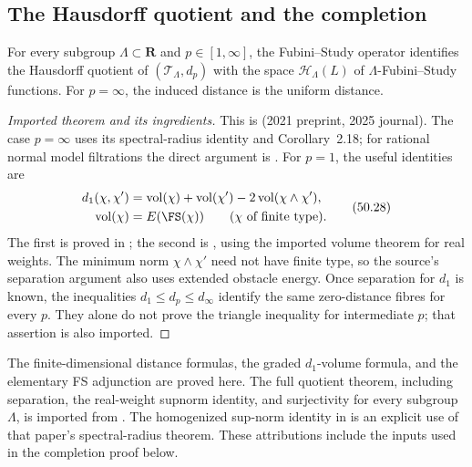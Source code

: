 \subsection{The Hausdorff quotient and the completion}
\label{sec:ch50-quotient}

\begin{theorem}\label{thm:stability-fs-quotient}
For every subgroup $\Lambda\subset\mathbf R$ and
$p\in[1,\infty]$, the Fubini--Study operator identifies the Hausdorff
quotient of $(\mathcal T_\Lambda,d_p)$ with the space
$\mathcal H_\Lambda(L)$ of $\Lambda$-Fubini--Study functions.
For $p=\infty$, the induced distance is the uniform distance.
\end{theorem}

\begin{proof}[Imported theorem and its ingredients]
This is \cite[Theorem~A]{BJKS1} (2021 preprint, 2025 journal).
The case $p=\infty$ uses its spectral-radius identity and
Corollary~2.18; for rational normal model filtrations the direct argument
is .  For $p=1$, the useful identities are
\[
\begin{split}
 d_1(\chi,\chi')
 &=\operatorname{vol}(\chi)+\operatorname{vol}(\chi')
       -2\operatorname{vol}(\chi\wedge\chi'),\\
 \operatorname{vol}(\chi)&=E(\FS(\chi))
       \qquad(\chi\text{ of finite type}).
\end{split}
\tag{50.28}\label{eq:stability-d1-volume-energy}
\]
The first is proved in ; the second is
, using the imported volume theorem for real
weights.  The minimum norm $\chi\wedge\chi'$ need not have finite
type, so the source's separation argument also uses extended obstacle
energy.  Once separation for $d_1$ is known, the inequalities
$d_1\le d_p\le d_\infty$ identify the same zero-distance fibres for
every $p$.  They alone do not prove the triangle inequality for
intermediate $p$; that assertion is also imported.
\end{proof}

\begin{remark}
\label{rem:ch50-quotient-status}
The finite-dimensional distance formulas, the graded $d_1$-volume
formula, and the elementary FS adjunction are proved here.  The full
quotient theorem, including separation, the real-weight supnorm identity,
and surjectivity for every subgroup $\Lambda$, is imported from
\cite[Theorem~A]{BJKS1}.  The homogenized sup-norm identity in
 is an explicit use of that paper's
spectral-radius theorem.  These attributions include the inputs used in
the completion proof below.
\end{remark}

